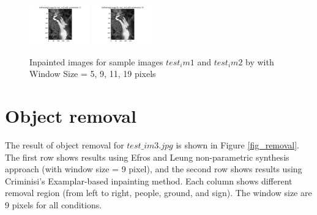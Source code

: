 \documentclass{extarticle}
\theoremstyle{definition}
\theoremstyle{definition}
\begin{document}
\begin{figure}[h!]
	\includegraphics[width = 0.23\textwidth]{./figures/Inpainting_test_im2_size_11.png}
	\includegraphics[width = 0.23\textwidth]{./figures/Inpainting_test_im2_size_19.png}
	\caption{Inpainted images for sample images $test_im1$ and $test_im2$ by with Window Size = 5, 9, 11, 19 pixels}
	\label{fig_inpaint}
\end{figure}
\pagebreak
\section{Object removal}
The result of object removal for $test\_im3.jpg$ is shown in Figure \ref{fig_removal}. The first row shows results using Efros and Leung non-parametric synthesis approach (with window size = 9 pixel), and the second row shows results using Criminisi's Examplar-based inpainting method. Each column shows different removal region (from left to right, people, ground, and sign).  The window size are 9 pixels for all conditions.
\end{document}
